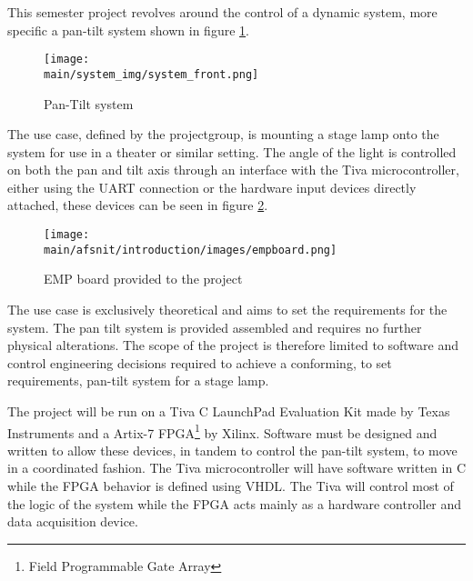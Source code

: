 \documentclass[../../main]{subfiles}
\begin{document}
This semester project revolves around the control of a dynamic system, more specific a pan-tilt  system shown in figure \ref{fig:system}.

\begin{figure}[H]
\centering
\texttt{[image: \\main/system\_img/system\_front.png]}
\caption{Pan-Tilt system}
\label{fig:system}
\end{figure}

The use case, defined by the projectgroup, is mounting a stage lamp onto the system for use in a theater or similar setting.
The angle of the light is controlled on both the pan and tilt axis through an interface with the Tiva microcontroller, either using the UART connection or the hardware input devices directly attached, these devices can be seen in figure \ref{fig:empboard}.

\begin{figure}[H]
\texttt{[image: \\main/afsnit/introduction/images/empboard.png]}
\caption{EMP board provided to the project}
\label{fig:empboard}
\end{figure}

The use case is exclusively theoretical and aims to set the requirements for the system.
The pan tilt system is provided assembled and requires no further physical alterations. The scope of the project is therefore limited to software and control engineering decisions required to achieve a conforming, to set requirements, pan-tilt system for a stage lamp.

The project will be run on a Tiva C LaunchPad Evaluation Kit made by Texas Instruments and a Artix-7 FPGA\footnote{Field Programmable Gate Array} by Xilinx. Software must be designed and written to allow these devices, in tandem to control the pan-tilt system, to move in a coordinated fashion.
The Tiva microcontroller will have software written in C while the FPGA behavior is defined using VHDL. The Tiva will control most of the logic of the system while the FPGA acts mainly as a hardware controller and data acquisition device.
\end{document}
